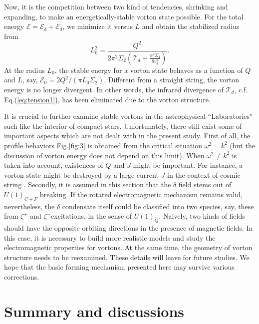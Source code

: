 \documentclass[prd, showpacs,nofootinbib,amsmath,amssymb]{revtex4}
\begin{document}
Now, it is the competition between two kind of tendencies, shrinking and expanding, to make an energetically-stable vorton state possible. For the total energy $\mathcal{E} = \mathcal{E}_\delta + \mathcal{E}_d$, we minimize it versus $L$ and obtain the stabilized radius from  
\begin{equation}
\label{eq:vortonr}
 L_0^2 = \frac{Q^2}{2\pi^2\Sigma_2(\mathcal{T}_d +
   \frac{\alpha' \Sigma_4}{8v_\delta^2})}.
\end{equation}
At the radius $L_0$, the stable energy for a vorton state behaves as a
function of $Q$ and $L$, say, $\mathcal{E}_0 = 2 Q^2/(\pi L_0 \Sigma_2)$.
Different from a straight string, the vorton energy is no longer divergent. In other words, the infrared divergence of $\mathcal{T}_d$, c.f. Eq.(\ref{eq:tension1}), has been eliminated due to the vorton structure.

It is crucial to further examine stable vortons in the astrophysical ``Laboratories" such like the interior of compact stars.
Unfortunately, there still exist some of important aspects which are not dealt with in the present study. 
First of all, the profile behaviors Fig.\ref{fig:3} is obtained from the critical situation $\omega^2 = k^2$ (but the discussion of vorton energy does not depend on this limit). When $\omega^2 \neq k^2$ is taken into account, existences of $Q$ and $J$ might be important. For instance, a vorton state might be destroyed by a large current $J$ in the context of cosmic string \cite{vilenkin2000cosmic}.
Secondly, it is assumed in this section that the $\delta$ field stems out of $U(1)_{C+F}$ breaking.
If the rotated electromagnetic mechanism remains valid, nevertheless, the $\delta$ condensate itself could be classified into two species, say, these from $\zeta^+$ and $\zeta^-$excitations, in the sense of $U(1)_{\widetilde{Q}}$. 
Naively, two kinds of fields should have the opposite orbiting directions in the presence of magnetic fields.
In this case, it is necessary to build more realistic models and study the electromagnetic properties for vortons. 
At the same time, the geometry of vorton structure needs to be reexamined. These details will leave for future studies. We hope that the basic forming mechanism presented here may survive various corrections.

\section{\bf Summary and discussions}
\label{sec:4}
\vspace{0.2cm}
\end{document}
